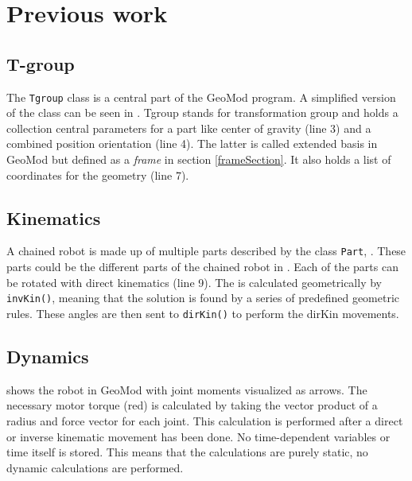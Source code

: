\chapter{Previous work}\label{previous_work}


\section{T-group}


The \texttt{Tgroup} class is a central part of the GeoMod program. A simplified version of the class can be seen in . Tgroup stands for transformation group and holds a collection central parameters for a part like center of gravity (line 3) and a combined position orientation (line 4). The latter is called extended basis in GeoMod but defined as a \textit{frame} in section \ref{frameSection}. It also holds a list of coordinates for the geometry (line 7).

\label{Tgroup}


\section{Kinematics}


A chained robot is made up of multiple parts described by the class \texttt{Part}, . These parts could be the different parts of the chained robot in . Each of the parts can be rotated with direct kinematics (line 9). The  is calculated geometrically by \texttt{invKin()}, meaning that the solution is found by a series of predefined geometric rules. These angles are then sent to \texttt{dirKin()} to perform the dirKin  movements.

\label{Part}

\section{Dynamics}

 shows the robot in GeoMod with joint moments visualized as arrows. The necessary motor torque (red) is calculated by taking the vector product of a radius and force vector for each joint. This calculation is performed after a direct or inverse kinematic movement has been done. No time-dependent variables or time itself is stored. This means that the calculations are purely static, no dynamic calculations are performed.

